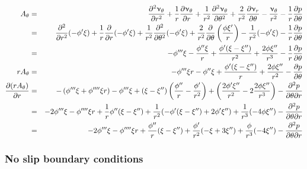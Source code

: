 \begin{eqnarray}
A_\theta 
&=&
\frac{\partial^2 \upnu_\theta}{\partial r^2} 
+ \frac{1}{r} \frac{\partial \upnu_\theta}{\partial r} 
+ \frac{1}{r^2} \frac{\partial^2 \upnu_\theta}{\partial \theta^2}
+\frac{2}{r^2} \frac{\partial \upnu_r}{\partial \theta} 
- \frac{\upnu_\theta}{r^2} 
-\frac{1}{r}\frac{\partial p}{\partial \theta}
\nonumber\\
&=&
\frac{\partial^2 }{\partial r^2}(-\phi' \xi) 
+ \frac{1}{r} \frac{\partial }{\partial r} (-\phi' \xi)
+ \frac{1}{r^2} \frac{\partial^2 }{\partial \theta^2}(-\phi' \xi)
+\frac{2}{r^2} \frac{\partial }{\partial \theta} 
\left(\frac{\phi \xi'}{r} \right)
- \frac{1}{r^2} (-\phi' \xi) -\frac{1}{r}\frac{\partial p}{\partial \theta} \nonumber\\
&=& - \phi''' \xi 
- \frac{\phi'' \xi}{r} 
+ \frac{\phi' (\xi -\xi'')}{r^2} 
+\frac{2 \phi \xi''}{r^3} 
-\frac{1}{r}\frac{\partial p}{\partial \theta} \nonumber\\
r A_\theta &=& 
- \phi''' \xi r
- \phi'' \xi
+ \frac{\phi' (\xi -\xi'')}{r} 
+\frac{2 \phi \xi''}{r^2} 
  -\frac{\partial p}{\partial \theta}\nonumber\\
\frac{\partial (r A_\theta)}{\partial r} 
&=& 
- \left( \phi''' \xi + \phi'''' \xi r \right)
- \phi''' \xi 
+ (\xi -\xi'') \left( \frac{\phi'' }{r} - \frac{\phi' }{r^2} \right)
+ \left(\frac{2 \phi' \xi''}{r^2} - 2 \frac{2 \phi \xi''}{r^3}\right)
-\frac{\partial^2 p}{\partial \theta \partial r}\nonumber\\
&=& -2\phi''' \xi - \phi'''' \xi r
+ \frac{1}{r  } \phi'' (\xi -\xi'')
+ \frac{1}{r^2} ( -\phi' (\xi-\xi'') + 2 \phi' \xi'' )
+ \frac{1}{r^3} (-4 \phi \xi''  )
-\frac{\partial^2 p}{\partial \theta \partial r} \nonumber\\
&=& -2\phi''' \xi - \phi'''' \xi r
+ \frac{\phi''}{r  }  (\xi -\xi'')
+ \frac{\phi'}{r^2}  ( - \xi +3\xi''  )
+ \frac{\phi}{r^3} (-4  \xi''  )
-\frac{\partial^2 p}{\partial \theta \partial r} 
\end{eqnarray}




\subsubsection*{No slip boundary conditions}

